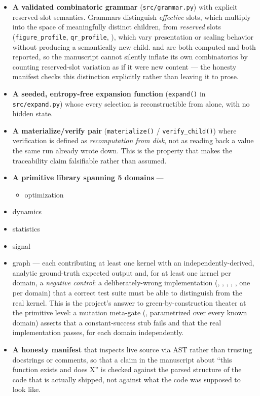\documentclass[
]{article}
\providecommand{\tightlist}{%
  \setlength{\itemsep}{0pt}\setlength{\parskip}{0pt}}
\begin{document}
\begin{itemize}
\tightlist
\item
  \textbf{A validated combinatoric grammar} (\texttt{src/grammar.py})
  with explicit reserved-slot semantics. Grammars distinguish
  \emph{effective} slots, which multiply into the space of meaningfully
  distinct children, from \emph{reserved} slots
  (\texttt{figure\_profile}, \texttt{qr\_profile},
  ), which vary presentation or sealing
  behavior without producing a semantically new child.
   and
   are both computed and both
  reported, so the manuscript cannot silently inflate its own
  combinatorics by counting reserved-slot variation as if it were new
  content --- the honesty manifest checks this distinction explicitly
  rather than leaving it to prose.
\item
  \textbf{A seeded, entropy-free expansion function} (\texttt{expand()}
  in \texttt{src/expand.py}) whose every selection is reconstructible
  from  alone, with no
  hidden state.
\item
  \textbf{A materialize/verify pair} (\texttt{materialize()} /
  \texttt{verify\_child()}) where verification is defined as
  \emph{recomputation from disk}, not as reading back a value the same
  run already wrote down. This is the property that makes the
  traceability claim falsifiable rather than assumed.
\item
  \textbf{A primitive library spanning 5 domains} ---

  \begin{itemize}
  \tightlist
  \item
    optimization
  \end{itemize}
\item
  dynamics
\item
  statistics
\item
  signal
\item
  graph --- each contributing at least one kernel with an
  independently-derived, analytic ground-truth expected output and, for
  at least one kernel per domain, a \emph{negative control}: a
  deliberately-wrong implementation
  (,
  , ,
  ,
  , one per domain) that a correct test
  suite must be able to distinguish from the real kernel. This is the
  project's answer to green-by-construction theater at the primitive
  level: a mutation meta-gate (,
  parametrized over every known domain) asserts that a constant-success
  stub fails and that the real implementation passes, for each domain
  independently.
\item
  \textbf{A honesty manifest} that inspects live source via AST rather
  than trusting docstrings or comments, so that a claim in the
  manuscript about ``this function exists and does X'' is checked
  against the parsed structure of the code that is actually shipped, not
  against what the code was supposed to look like.
\end{itemize}
\end{document}
